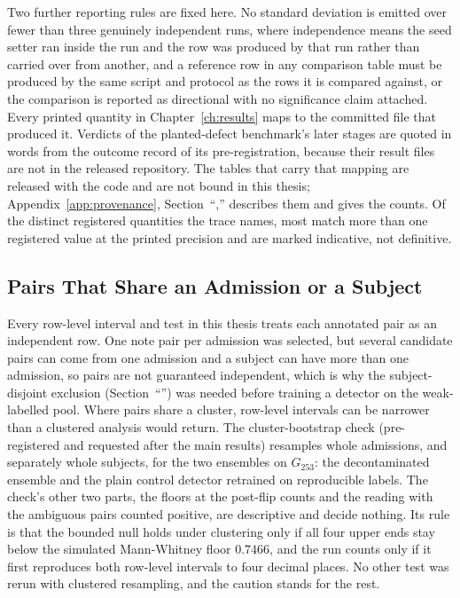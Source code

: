 Two further reporting rules are fixed here. No standard deviation
is emitted over fewer than three genuinely independent runs, where independence means the seed setter
ran inside the run and the row was produced by that run rather than carried over from another, and a
reference row in any comparison table must be produced by the same script and protocol as the rows it
is compared against, or the comparison is reported as directional with no significance claim
attached. Every printed quantity in Chapter~\ref{ch:results} maps to the committed file that
produced it. Verdicts of the planted-defect benchmark's later stages are quoted in words from the outcome record of its pre-registration, because their result files are not in the released repository. The tables that carry that mapping are released with the code and are not bound in this
thesis; Appendix~\ref{app:provenance}, Section~``,'' describes them and gives
the counts. Of the distinct registered quantities the trace names, most match more than one
registered value at the printed precision and are marked indicative, not definitive.

\subsection{Pairs That Share an Admission or a Subject}

Every row-level interval and test in this thesis treats each annotated pair as an independent row. One note
pair per admission was selected, but several candidate pairs can come from one admission and
a subject can have more than one admission, so pairs are not guaranteed independent, which
is why the subject-disjoint exclusion (Section~``'') was needed before
training a detector on the weak-labelled pool. Where pairs share a cluster, row-level intervals can
be narrower than a clustered analysis would return. The cluster-bootstrap check (pre-registered and
requested after the main results) resamples whole admissions, and separately whole
subjects, for the two ensembles on $G_{253}$: the decontaminated ensemble and the plain control detector retrained on reproducible labels. The check's other two parts, the floors at the post-flip counts and the reading with the ambiguous pairs counted positive, are descriptive and decide nothing. Its rule is that the bounded null holds under
clustering only if all four upper ends stay below the simulated Mann-Whitney floor $0.7466$, and the
run counts only if it first reproduces both row-level intervals to four decimal places. No other test was rerun with clustered resampling, and the caution stands for
the rest.

